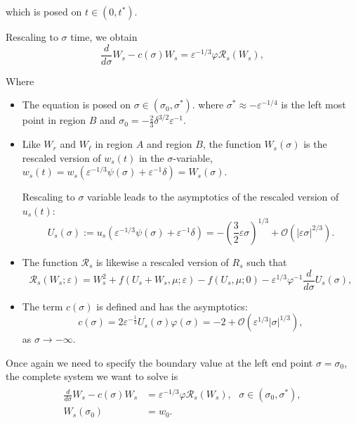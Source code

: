 \documentclass[letterpaper,11pt]{article}
\newcommand{\Ral}{\mathcal{R}}
\newcommand{\rmO}{\mathcal{O}}
\newcommand{\eps}{\varepsilon}
\numberwithin{equation}{section}
\theoremstyle{plain}
\begin{document}
which is posed on $t\in (0, t^*)$.

Rescaling to $\sigma$ time, we obtain
\begin{equation}
\frac{d}{d\sigma} W_s - c(\sigma)W_s = \eps^{-1/3}\varphi \Ral_s(W_s),
\end{equation}


Where 
\begin{itemize}
\item The equation is posed on $\sigma \in \left(\sigma_0, \sigma^*\right).$ where $\sigma^* \approx -\eps^{-1/4}$ is the left most point in region $B$ and $\sigma_0  =-\frac{2}{3}\delta^{3/2}\eps^{-1}$.

\item 
Like $W_r$ and $W_\ell$ in region $A$ and region $B$, the function $W_s(\sigma)$ is the rescaled version of $w_s(t)$ in the $\sigma$-variable, $w_s(t) = w_s(\eps^{-1/3}\psi(\sigma)+\eps^{-1}\delta) = W_s(\sigma)$. 

Rescaling to $\sigma$ variable leads to the asymptotics of the rescaled version of $u_s(t)$:
\begin{equation}\label{sing_exp}
U_s(\sigma) :=u_s(\eps^{-1/3}\psi(\sigma)+\eps^{-1}\delta)= -\left(\frac{3}{2}\eps \sigma\right)^{1/3} + \rmO(|\eps \sigma|^{2/3} ).
\end{equation}

\item The function $\Ral_s$ is likewise a rescaled version of $R_s$ such that 
\[
\Ral_s(W_s;\eps) = W_s^2+ f(U_s+W_s, \mu ; \eps)-f(U_s,\mu;0)- \eps^{1/3}\varphi^{-1} \frac{d}{d\sigma}U_s(\sigma),
\] 


\item The term $c(\sigma)$ is defined and has the asymptotics:
\[
c(\sigma) = 2\eps^{-\frac{1}{3}}U_s(\sigma)\varphi(\sigma) = -2 + \rmO(\eps^{1/3}|\sigma|^{1/3}),
\]
as $\sigma \to -\infty$.


\end{itemize}
 
Once again we need to specify the boundary value at the left end point $\sigma = \sigma_0$, the complete system we want to solve is
\begin{align}\label{ws_bp}
\begin{split}
\frac{d}{d\sigma} W_s - c(\sigma)W_s &= \eps^{-1/3}\varphi \Ral_s(W_s), \text{ }\sigma \in (\sigma_0,\sigma^*),\\
W_s(\sigma_0) &= w_0.
\end{split}
\end{align}
\end{document}
